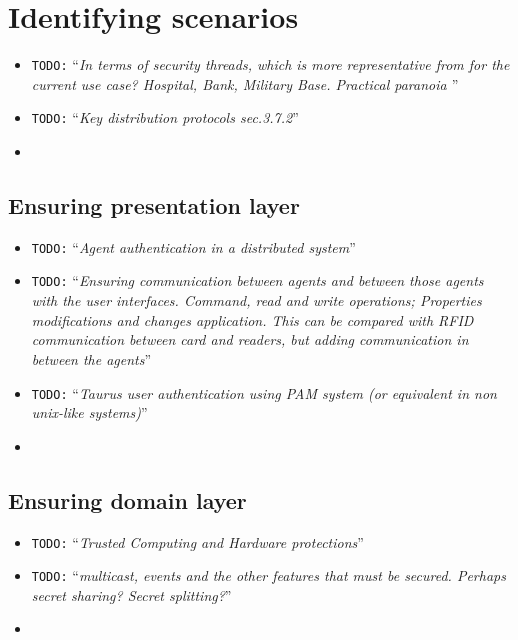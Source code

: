 \documentclass[10pt,a4paper,twoside]{llncs}
\newcommand{\todo}[1]{\texttt{\color{red}TODO:} ``\emph{#1}''}
\begin{document}
%
\section{Identifying scenarios \label{sec:scenarios}}

\begin{itemize}
 \item \todo{In terms of security threads, which is more representative from \cite{SecEngRossAnderson} for the current use case? Hospital, Bank, Military Base. Practical paranoia \cite{PractCryptoSchneier}}
 \item \todo{Key distribution protocols \cite{SecEngRossAnderson} sec.3.7.2}
 \item 
\end{itemize}

%
\subsection{Ensuring presentation layer}

\begin{itemize}
 \item \todo{Agent authentication in a distributed system}
 \item \todo{Ensuring communication between agents and between those agents with the user interfaces. \emph{Command}, \emph{read} and \emph{write} operations; \emph{Properties} modifications and changes application. This can be compared with \emph{RFID} communication between card and readers, but adding communication in between the agents}
 \item \todo{Taurus user authentication using PAM system (or equivalent in non unix-like systems)}
 \item 
\end{itemize}

%
\subsection{Ensuring domain layer}

\begin{itemize}
 \item \todo{Trusted Computing and Hardware protections}
 \item \todo{multicast, events and the other features that must be secured. Perhaps secret sharing? Secret splitting?}
 \item 
\end{itemize}

%
\end{document}
